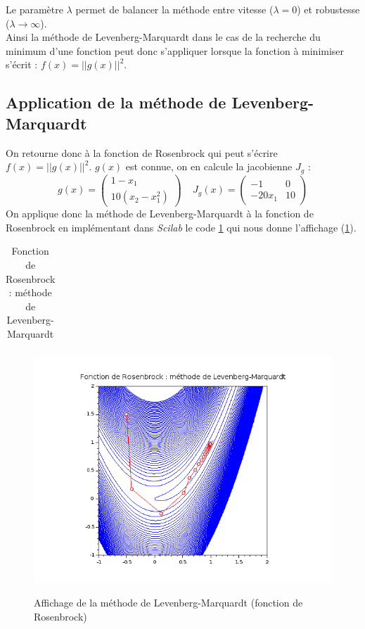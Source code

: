 \documentclass[a4paper,10pt]{report}
\begin{document}
Le paramètre $\lambda$ permet de balancer la méthode entre vitesse ($\lambda = 0$) et robustesse ($\lambda\longrightarrow \infty$). \\

Ainsi la méthode de Levenberg-Marquardt dans le cas de la recherche du minimum d'une fonction peut donc s'appliquer lorsque la fonction à minimiser s'écrit : $f(x)=||g(x)||^2$.


\subsection{Application de la méthode de Levenberg-Marquardt}
On retourne donc à la fonction de Rosenbrock qui peut s'écrire $f(x)=||g(x)||^2$. $g(x)$ est connue, on en calcule la jacobienne $J_g$ :
\abovedisplayskip=0mm
\begin{displaymath}
g(x) = \left( \begin{array}{c} 1 - x_1 \\ 10(x_2-x_1^2) \end{array} \right) \ \ \ \ \ J_g(x) = \left( \begin{array}{cc} -1 & 0 \\ -20x_1 & 10 \end{array} \right)
\end{displaymath}
On applique donc la méthode de Levenberg-Marquardt à la fonction de Rosenbrock en implémentant dans \textit{Scilab} le code \ref{banana_levenberg} qui nous donne l'affichage (\ref{banana_graph2}).

\begin{table}[H]
\caption{Fonction de Rosenbrock : méthode de Levenberg-Marquardt}
\begin{tabular}{l}

\label{banana_levenberg}
\end{tabular}
\end{table}

\begin{figure}[H]
\centering
\caption{Affichage de la méthode de Levenberg-Marquardt (fonction de Rosenbrock)}
\includegraphics[width=13cm]{banana_2.png}
\label{banana_graph2}
\end{figure}
\end{document}
